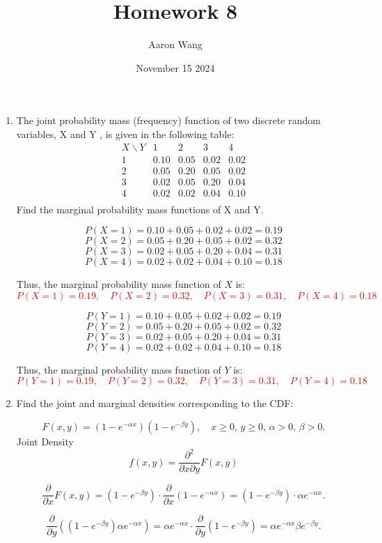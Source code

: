 \documentclass{article}
\title{Homework 8}
\author{Aaron Wang}
\date{November 15 2024}
\begin{document}
\maketitle
\begin{enumerate}
    \item The joint probability mass (frequency) function of two discrete random
variables, X and Y , is given in the following table:
\[
\begin{array}{c|cccc}
X \backslash Y & 1 & 2 & 3 & 4 \\
\hline
1 & 0.10 & 0.05 & 0.02 & 0.02 \\
2 & 0.05 & 0.20 & 0.05 & 0.02 \\
3 & 0.02 & 0.05 & 0.20 & 0.04 \\
4 & 0.02 & 0.02 & 0.04 & 0.10 \\
\end{array}
\]
Find the marginal probability mass functions of X and Y.

\[
P(X = 1) = 0.10 + 0.05 + 0.02 + 0.02 = 0.19
\]
\[
P(X = 2) = 0.05 + 0.20 + 0.05 + 0.02 = 0.32
\]
\[
P(X = 3) = 0.02 + 0.05 + 0.20 + 0.04 = 0.31
\]
\[
P(X = 4) = 0.02 + 0.02 + 0.04 + 0.10 = 0.18
\]

Thus, the marginal probability mass function of \( X \) is:
\textcolor{red}{
\[
P(X = 1) = 0.19, \quad P(X = 2) = 0.32, \quad P(X = 3) = 0.31, \quad P(X = 4) = 0.18
\]
}

\[
P(Y = 1) = 0.10 + 0.05 + 0.02 + 0.02 = 0.19
\]
\[
P(Y = 2) = 0.05 + 0.20 + 0.05 + 0.02 = 0.32
\]
\[
P(Y = 3) = 0.02 + 0.05 + 0.20 + 0.04 = 0.31
\]
\[
P(Y = 4) = 0.02 + 0.02 + 0.04 + 0.10 = 0.18
\]

Thus, the marginal probability mass function of \( Y \) is:
\textcolor{red}{
\[
P(Y = 1) = 0.19, \quad P(Y = 2) = 0.32, \quad P(Y = 3) = 0.31, \quad P(Y = 4) = 0.18
\]
}
\pagebreak
\item Find the joint and marginal densities corresponding to the CDF:

\[
F(x, y) = (1 - e^{-\alpha x})(1 - e^{-\beta y}), \quad x \geq 0, \, y \geq 0, \, \alpha > 0, \, \beta > 0.
\]
Joint Density
\[
f(x, y) = \frac{\partial^2}{\partial x \partial y} F(x, y)
\]

\[
\frac{\partial}{\partial x} F(x, y) = (1 - e^{-\beta y}) \cdot \frac{\partial}{\partial x} (1 - e^{-\alpha x}) = (1 - e^{-\beta y}) \cdot \alpha e^{-\alpha x}.
\]

\[
\frac{\partial}{\partial y} \left( (1 - e^{-\beta y}) \alpha e^{-\alpha x} \right) = \alpha e^{-\alpha x} \cdot \frac{\partial}{\partial y} (1 - e^{-\beta y}) = \alpha e^{-\alpha x} \beta e^{-\beta y}.
\]


\end{enumerate}
\end{document}
